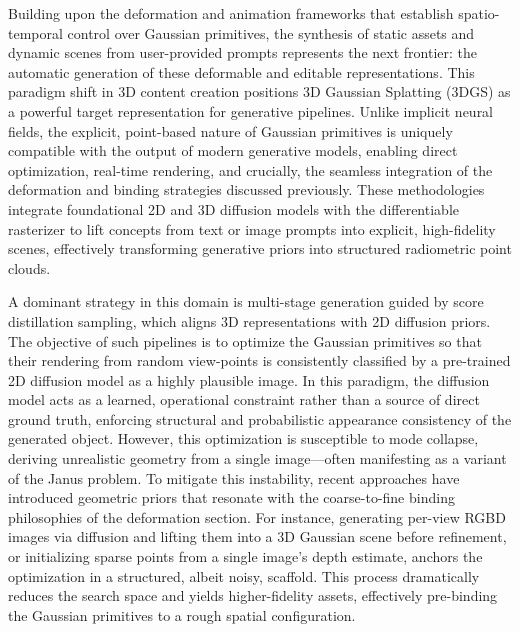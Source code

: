 \documentclass[11pt,a4paper]{article}
\begin{document}
Building upon the deformation and animation frameworks that establish spatio-temporal control over Gaussian primitives, the synthesis of static assets and dynamic scenes from user-provided prompts represents the next frontier: the automatic generation of these deformable and editable representations. This paradigm shift in 3D content creation positions 3D Gaussian Splatting (3DGS) as a powerful target representation for generative pipelines. Unlike implicit neural fields, the explicit, point-based nature of Gaussian primitives is uniquely compatible with the output of modern generative models, enabling direct optimization, real-time rendering, and crucially, the seamless integration of the deformation and binding strategies discussed previously. These methodologies integrate foundational 2D and 3D diffusion models with the differentiable rasterizer to lift concepts from text or image prompts into explicit, high-fidelity scenes, effectively transforming generative priors into structured radiometric point clouds.

A dominant strategy in this domain is multi-stage generation guided by score distillation sampling, which aligns 3D representations with 2D diffusion priors. The objective of such pipelines is to optimize the Gaussian primitives so that their rendering from random view-points is consistently classified by a pre-trained 2D diffusion model as a highly plausible image. In this paradigm, the diffusion model acts as a learned, operational constraint rather than a source of direct ground truth, enforcing structural and probabilistic appearance consistency of the generated object. However, this optimization is susceptible to mode collapse, deriving unrealistic geometry from a single image---often manifesting as a variant of the Janus problem. To mitigate this instability, recent approaches have introduced geometric priors that resonate with the coarse-to-fine binding philosophies of the deformation section. For instance, generating per-view RGBD images via diffusion and lifting them into a 3D Gaussian scene before refinement, or initializing sparse points from a single image's depth estimate, anchors the optimization in a structured, albeit noisy, scaffold. This process dramatically reduces the search space and yields higher-fidelity assets, effectively pre-binding the Gaussian primitives to a rough spatial configuration.
\end{document}
